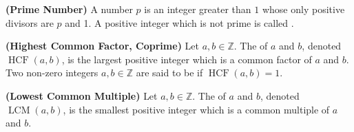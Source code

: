 \documentclass{article}
\newcommand{\bfs}[1]{\textbf{({#1}) }}
\newcommand{\HCF}{\operatorname{HCF}}
\newcommand{\LCM}{\operatorname{LCM}}
\begin{document}
\begin{defa}{\bfs{Prime Number}}
A  number $p$ is an integer greater than $1$ whose only positive divisors are $p$ and 1. A positive integer which is not prime is called .
\end{defa}


\begin{defa}{\bfs{Highest Common Factor, Coprime}}
Let $a, b \in \mathbb{Z}$. The  of $a$ and $b$, denoted $\HCF(a, b)$, is the largest positive integer which is a common factor of $a$ and $b$. Two non-zero integers $a, b \in \mathbb{Z}$ are said to be  if $\HCF(a, b)=1$.
\end{defa}
\begin{defa}{\bfs{Lowest Common Multiple}}
Let $a, b \in \mathbb{Z}$. The  of $a$ and $b$, denoted $\LCM(a, b)$, is the smallest positive integer which is a common multiple of $a$ and $b$.
\end{defa}
\end{document}

